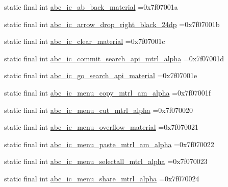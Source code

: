 \begin{DoxyCompactItemize}
\item 
static final int \mbox{\hyperlink{classcom_1_1example_1_1trainawearapplication_1_1_r_1_1drawable_a4f9a22e92e66d6537d73bea4e60a36f8}{abc\+\_\+ic\+\_\+ab\+\_\+back\+\_\+material}} =0x7f07001a
\item 
static final int \mbox{\hyperlink{classcom_1_1example_1_1trainawearapplication_1_1_r_1_1drawable_aa0f72fd793c9ecf05b0aecd6c1553504}{abc\+\_\+ic\+\_\+arrow\+\_\+drop\+\_\+right\+\_\+black\+\_\+24dp}} =0x7f07001b
\item 
static final int \mbox{\hyperlink{classcom_1_1example_1_1trainawearapplication_1_1_r_1_1drawable_a48080084889324a9297e052a36084caa}{abc\+\_\+ic\+\_\+clear\+\_\+material}} =0x7f07001c
\item 
static final int \mbox{\hyperlink{classcom_1_1example_1_1trainawearapplication_1_1_r_1_1drawable_ad5ac9b08f7f06acef53d1029e7636c1e}{abc\+\_\+ic\+\_\+commit\+\_\+search\+\_\+api\+\_\+mtrl\+\_\+alpha}} =0x7f07001d
\item 
static final int \mbox{\hyperlink{classcom_1_1example_1_1trainawearapplication_1_1_r_1_1drawable_a60b3a43251fde072d62c6e8e469b133e}{abc\+\_\+ic\+\_\+go\+\_\+search\+\_\+api\+\_\+material}} =0x7f07001e
\item 
static final int \mbox{\hyperlink{classcom_1_1example_1_1trainawearapplication_1_1_r_1_1drawable_a2796a6a196c932ffd7b401614ffd9d09}{abc\+\_\+ic\+\_\+menu\+\_\+copy\+\_\+mtrl\+\_\+am\+\_\+alpha}} =0x7f07001f
\item 
static final int \mbox{\hyperlink{classcom_1_1example_1_1trainawearapplication_1_1_r_1_1drawable_a4ed4fcc31a01ee3e954b09318427bcf0}{abc\+\_\+ic\+\_\+menu\+\_\+cut\+\_\+mtrl\+\_\+alpha}} =0x7f070020
\item 
static final int \mbox{\hyperlink{classcom_1_1example_1_1trainawearapplication_1_1_r_1_1drawable_a55f10ff6830565097ee53b292a19ffc9}{abc\+\_\+ic\+\_\+menu\+\_\+overflow\+\_\+material}} =0x7f070021
\item 
static final int \mbox{\hyperlink{classcom_1_1example_1_1trainawearapplication_1_1_r_1_1drawable_ad97a0704322ea66f29299675bcf49e47}{abc\+\_\+ic\+\_\+menu\+\_\+paste\+\_\+mtrl\+\_\+am\+\_\+alpha}} =0x7f070022
\item 
static final int \mbox{\hyperlink{classcom_1_1example_1_1trainawearapplication_1_1_r_1_1drawable_a69e5eb4492b31d79728374f03cce877a}{abc\+\_\+ic\+\_\+menu\+\_\+selectall\+\_\+mtrl\+\_\+alpha}} =0x7f070023
\item 
static final int \mbox{\hyperlink{classcom_1_1example_1_1trainawearapplication_1_1_r_1_1drawable_a7946ad7889197fe8aedece1697dc7f75}{abc\+\_\+ic\+\_\+menu\+\_\+share\+\_\+mtrl\+\_\+alpha}} =0x7f070024

\end{DoxyCompactItemize}
